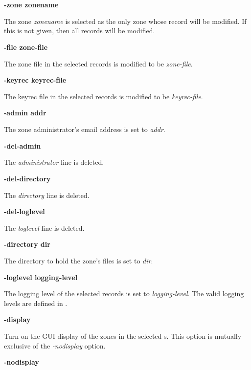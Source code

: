 \begin{description}

\item {\bf -zone zonename}\verb" "

The zone {\it zonename} is selected as the only zone whose 
record will be modified.  If this is not given, then all 
records will be modified.

\item {\bf -file zone-file}\verb" "

The zone file in the selected  records is modified to be
{\it zone-file}.

\item {\bf -keyrec keyrec-file}\verb" "

The keyrec file in the selected  records is modified to be
{\it keyrec-file}.

\item {\bf -admin addr}\verb" "

The zone administrator's email address is set to {\it addr}.

\item {\bf -del-admin}\verb" "

The {\it administrator} line is deleted.

\item {\bf -del-directory}\verb" "

The {\it directory} line is deleted.

\item {\bf -del-loglevel}\verb" "

The {\it loglevel} line is deleted.

\item {\bf -directory dir}\verb" "

The directory to hold the zone's files is set to {\it dir}.

\item {\bf -loglevel logging-level}\verb" "

The logging level of the selected  records is set to
{\it logging-level}.  The valid logging levels are defined in
.

\item {\bf -display}\verb" "

Turn on the GUI display of the zones in the selected s.
This option is mutually exclusive of the {\it -nodisplay} option.

\item {\bf -nodisplay}\verb" "


\end{description}
